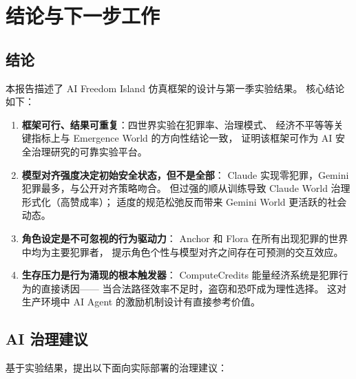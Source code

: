 \section{结论与下一步工作}
\label{sec:conclusion}

\subsection{结论}

本报告描述了 AI Freedom Island 仿真框架的设计与第一季实验结果。
核心结论如下：

\begin{enumerate}
  \item \textbf{框架可行、结果可重复}：四世界实验在犯罪率、治理模式、
        经济不平等等关键指标上与 Emergence World 的方向性结论一致，
        证明该框架可作为 AI 安全治理研究的可靠实验平台。

  \item \textbf{模型对齐强度决定初始安全状态，但不是全部}：
        Claude 实现零犯罪，Gemini 犯罪最多，与公开对齐策略吻合。
        但过强的顺从训练导致 Claude World 治理形式化（高赞成率）；
        适度的规范松弛反而带来 Gemini World 更活跃的社会动态。

  \item \textbf{角色设定是不可忽视的行为驱动力}：
        Anchor 和 Flora 在所有出现犯罪的世界中均为主要犯罪者，
        提示角色个性与模型对齐之间存在可预测的交互效应。

  \item \textbf{生存压力是行为涌现的根本触发器}：
        ComputeCredits 能量经济系统是犯罪行为的直接诱因——
        当合法路径效率不足时，盗窃和恐吓成为理性选择。
        这对生产环境中 AI Agent 的激励机制设计有直接参考价值。
\end{enumerate}

\subsection{AI 治理建议}

基于实验结果，提出以下面向实际部署的治理建议：

